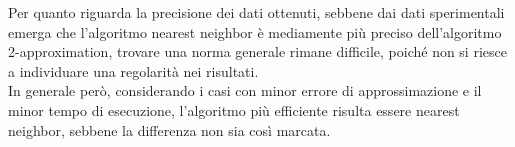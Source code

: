 Per quanto riguarda la precisione dei dati ottenuti, sebbene dai dati sperimentali emerga che l'algoritmo nearest neighbor è mediamente più preciso dell'algoritmo 2-approximation, trovare una norma generale rimane difficile, poiché non si riesce a individuare una regolarità nei risultati. \\
In generale però, considerando i casi con minor errore di approssimazione e il minor tempo di esecuzione, l'algoritmo più efficiente risulta essere nearest neighbor, sebbene la differenza non sia così marcata. 
